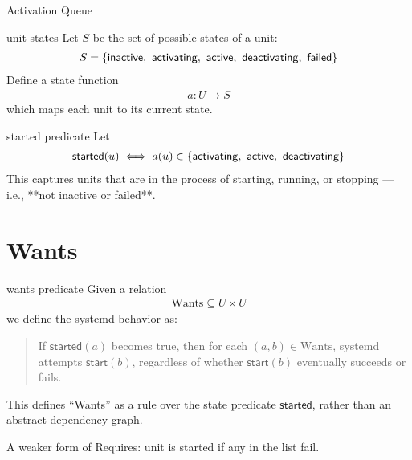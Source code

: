 \documentclass[openany, 12pt]{book}
\begin{document}
\begin{definition}{Activation Queue}{}

\end{definition}

\begin{definition}{unit states}{}
	Let $S$ be the set of possible states of a unit:
	\begin{align*}
		S = \set{ \mathsf{inactive},\ \mathsf{activating},\ \mathsf{active},\ \mathsf{deactivating},\ \mathsf{failed}}
	\end{align*}
	Define a state function
	\begin{align*}
		a : U \to S
	\end{align*}
	which maps each unit to its current state.
\end{definition}

\begin{definition}{started predicate}{}
	Let
	\begin{align*}
		\mathsf{started}(u) \iff a(u) \in \set{ \mathsf{activating},\ \mathsf{active},\ \mathsf{deactivating}}
	\end{align*}
	This captures units that are in the process of starting, running, or
	stopping — i.e., **not inactive or failed**.
\end{definition}

\section{Wants}
\begin{definition}{wants predicate}{}
	Given a relation
	\begin{align*}
		\text{Wants} \subseteq U \times U
	\end{align*}
	we define the systemd behavior as:

	\begin{quote}
		If $\mathsf{started}(a)$ becomes true, then for each $(a, b) \in
			\text{Wants}$, systemd attempts $\mathsf{start}(b)$, regardless of
		whether $\mathsf{start}(b)$ eventually succeeds or fails.
	\end{quote}

	This defines ``Wants'' as a rule over the state predicate $\mathsf{started}$,
	rather than an abstract dependency graph.

	A weaker form of Requires: unit is started if any in the list fail.
\end{definition}
\end{document}
